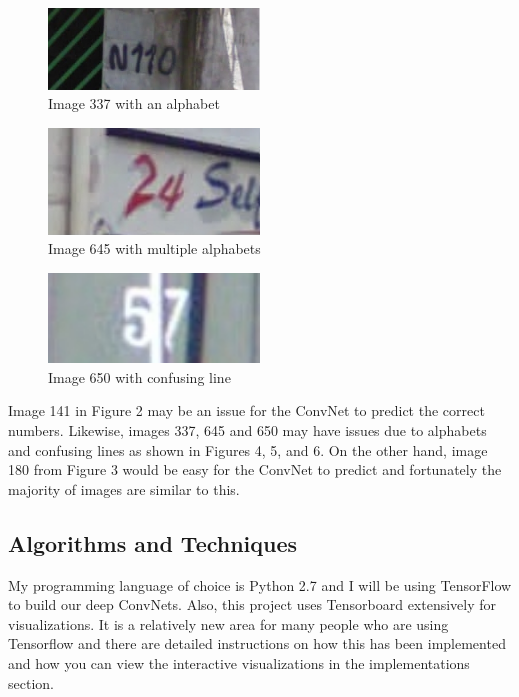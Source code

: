 \documentclass[twoside, column]{article}
\begin{document}
\begin{figure}
\caption{Image 337 with an alphabet}
\centering
\includegraphics[width=0.5\textwidth]{337_alphabets}
\end{figure}

\begin{figure}
\caption{Image 645 with multiple alphabets}
\centering
\includegraphics[width=0.5\textwidth]{645_alphabets}
\end{figure}

\begin{figure}
\caption{Image 650 with confusing line}
\centering
\includegraphics[width=0.5\textwidth]{650_confusing}
\end{figure}

Image 141 in Figure 2 may be an issue for the ConvNet to predict the correct numbers.  Likewise, images 337, 645 and 650 may have issues due to alphabets and confusing lines as shown in Figures 4, 5, and 6. On the other hand, image 180 from Figure 3 would be easy for the ConvNet to predict and fortunately the majority of images are similar to this. 

\subsection{Algorithms and Techniques}

My programming language of choice is Python 2.7 and I will be using TensorFlow to build our deep ConvNets. Also, this project uses Tensorboard extensively for visualizations. It is a relatively new area for many people who are using Tensorflow and there are detailed instructions on how this has been implemented and how you can view the interactive visualizations in the implementations section.
\end{document}
